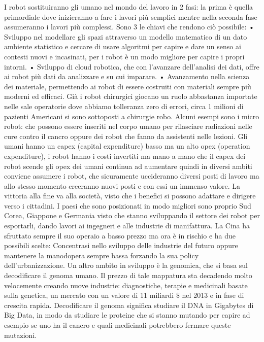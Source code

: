 \documentclass[11pt, a4page, twocolumn]{article}
\begin{document}
I robot sostituiranno gli umano nel mondo del lavoro in 2 fasi: la prima è quella primordiale dove inizieranno a fare i lavori più semplici mentre nella seconda fase assumeranno i lavori più complessi. Sono 3 le chiavi che rendono ciò possibile:
    • Sviluppo nel modellare gli spazi attraverso un modello matematico di un dato ambiente statistico e cercare di usare algoritmi per capire e dare un senso ai contesti nuovi e incasinati, per i robot è un modo migliore per capire i propri intorni.
    • Sviluppo di cloud robotica, che con l’avanzare dell’analisi dei dati, offre ai robot più dati da analizzare e su cui imparare.
    • Avanzamento nella scienza dei materiale, permettendo ai robot di essere costruiti con materiali sempre più moderni ed efficaci.
Già i robot chirurgici giocano un ruolo abbastanza importate nelle sale operatorie dove abbiamo tolleranza zero di errori, circa 1 milioni di pazienti Americani si sono sottoposti a chirurgie robo. Alcuni esempi sono i micro robot: che possono essere inseriti nel corpo umano per rilasciare radiazioni nelle cure contro il cancro oppure dei robot che fanno da assistenti nelle lezioni.
Gli umani hanno un capex (capital expenditure) basso ma un alto opex (operation expenditure), i robot hanno i costi invertiti ma mano a mano che il capex dei robot scende gli opex dei umani continua ad aumentare quindi in diversi ambiti conviene assumere i robot, che sicuramente uccideranno diversi posti di lavoro ma allo stesso momento creeranno nuovi posti e con essi un immenso valore. La vittoria alla fine va alla società, visto che i benefici si possono adattare e dirigere verso i cittadini. I paesi che sono posizionati in modo migliori sono proprio Sud Corea, Giappone e Germania visto che stanno sviluppando il settore dei robot per esportarli, dando lavori ai ingegneri e alle industrie di manifattura. La Cina ha sfruttato sempre il suo operaio a basso prezzo ma ora è in rischio e ha due possibili scelte: Concentrasi nello sviluppo delle industrie del futuro oppure mantenere la manodopera sempre bassa forzando la sua policy dell'urbanizzazione. 
Un altro ambito in sviluppo è la genomica, che si basa sul decodificare il genoma umano. Il prezzo di tale mappatura sta decadendo molto velocemente creando nuove industrie: diagnostiche, terapie e medicinali basate sulla genetica, un mercato con un valore di 11 miliardi $\$$ nel 2013 e in fase di crescita rapida. Decodificare il genoma significa studiare il DNA in Gigabytes di Big Data, in modo da studiare le proteine che si stanno mutando per capire ad esempio se uno ha il cancro e quali medicinali potrebbero fermare queste mutazioni.
\end{document}
